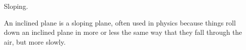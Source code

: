 Sloping.
\par
An inclined plane is a sloping plane, often used in
physics because things roll down an inclined plane 
in more or less the same way that they fall through the 
air, but more slowly.